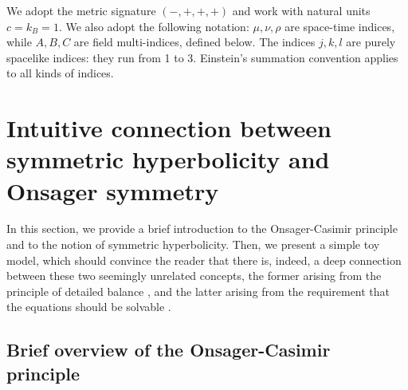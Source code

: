 \documentclass[a4paper, amsfonts, amssymb, amsmath, reprint, showkeys, nofootinbib, twoside, onecolumn,notitlepage]{revtex4-1}
\begin{document}
We adopt the metric signature $(-,+,+,+)$ and work with natural units $c=k_B=1$. We also adopt the following notation: $\mu,\nu,\rho$ are space-time indices, while $A,B,C$ are field multi-indices, defined below. The indices $j,k,l$ are purely spacelike indices: they run from 1 to 3. Einstein's summation convention applies to all kinds of indices. 


\section{Intuitive connection between symmetric hyperbolicity and Onsager symmetry}

In this section, we provide a brief introduction to the Onsager-Casimir principle and to the notion of symmetric hyperbolicity. Then, we present a simple toy model, which should convince the reader that there is, indeed, a deep connection between these two seemingly unrelated concepts, the former arising from the principle of detailed balance \cite{Onsager_1931}, and the latter arising from the requirement that the equations should be solvable \cite{Kato2009}.

\subsection{Brief overview of the Onsager-Casimir principle}
\end{document}
